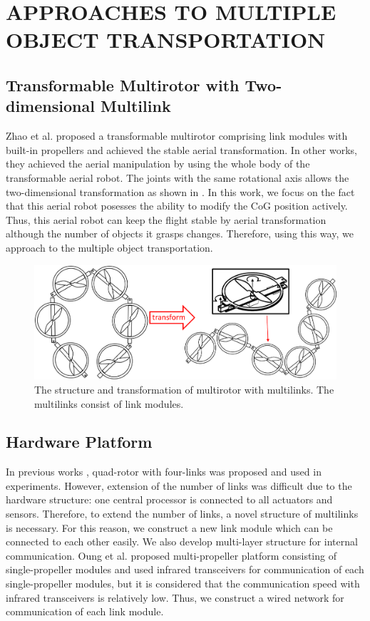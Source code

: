 \section{APPROACHES TO MULTIPLE OBJECT TRANSPORTATION}
\subsection{Transformable Multirotor with Two-dimensional Multilink}
Zhao et al.\cite{Zhao2016} proposed a transformable multirotor comprising link modules with built-in propellers and achieved the stable aerial transformation. In other works\cite{ZhaoISER2016}\cite{ZhaoICRA2017}, they achieved the aerial manipulation by using the whole body of the transformable aerial robot. The joints with the same rotational axis allows the two-dimensional transformation as shown in . In this work, we focus on the fact that this aerial robot posesses the ability to modify the CoG position actively. Thus, this aerial robot can keep the flight stable by aerial transformation although the number of objects it grasps changes. Therefore, using this way, we approach to the multiple object transportation.
\begin{figure}[t]
  \begin{center}
    \includegraphics[width=1.0\columnwidth]{figs/multilink.pdf}
  \end{center}
  \caption{The structure and transformation of multirotor with multilinks. The multilinks consist of link modules.\label{figure:multi_link}}
\end{figure}
   
\subsection{Hardware Platform}
In previous works \cite{ZhaoISER2016}\cite{ZhaoICRA2017}\cite{Zhao2016}, quad-rotor with four-links was proposed and used in experiments. However, extension of the number of links was difficult due to the hardware structure: one central processor is connected to all actuators and sensors. Therefore, to extend the number of links, a novel structure of multilinks is necessary. For this reason, we construct a new link module which can be connected to each other easily. We also develop multi-layer structure for internal communication. Oung et al.\cite{Oung2010} proposed multi-propeller platform consisting of single-propeller modules and used infrared transceivers for communication of each single-propeller modules, but it is considered that the communication speed with infrared transceivers is relatively low. Thus, we construct a wired network for communication of each link module. 

